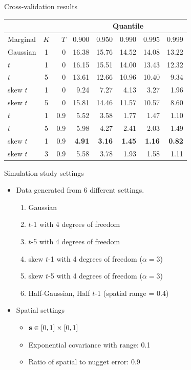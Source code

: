 \documentclass{beamer}
\begin{document}
\begin{frame}{Cross-validation results}
  \begin{table}[htbp]
    \small
    \centering
    \begin{tabular}{l|c|r|rrrrr}
          \multicolumn{3}{c}{\ } & \multicolumn{5}{c}{Quantile}\\
           \hline
  Marginal & $K$ & $T$  & 0.900 & 0.950 & 0.990 & 0.995 & 0.999\\
  \hline
Gaussian & 1 & 0 & 16.38 & 15.76 & 14.52 & 14.08 & 13.22\\
$t$ & 1 & 0 & 16.15 & 15.51 & 14.00 & 13.43 & 12.32\\
$t$ & 5 & 0 & 13.61 & 12.66 & 10.96 & 10.40 & 9.34\\
skew $t$ & 1 & 0 & 9.24  & 7.27 & 4.13  & 3.27  & 1.96\\
skew $t$ & 5 & 0 & 15.81 & 14.46 & 11.57 & 10.57 & 8.60\\
$t$ & 1 & 0.9 & 5.52  & 3.58  & 1.77  & 1.47  & 1.10\\
$t$ & 5 & 0.9 & 5.98  & 4.27  & 2.41  & 2.03  & 1.49\\
 skew $t$ & 1 & 0.9 & {\bf 4.91}  & {\bf 3.16} & {\bf 1.45}  & {\bf 1.16}  & {\bf 0.82}\\
skew $t$ & 3 & 0.9 & 5.58 & 3.78 & 1.93& 1.58& 1.11\\
\hline
    \end{tabular}
  \end{table}
\end{frame}

\begin{frame}{Simulation study settings}
  \begin{itemize} \setlength{\itemsep}{0.5em}
    \item Data generated from 6 different settings.
    \begin{enumerate}[1.]
      \item Gaussian
      \item $t$-1 with 4 degrees of freedom
      \item $t$-5 with 4 degrees of freedom
      \item skew $t$-1 with 4 degrees of freedom ($\alpha = 3$)
      \item skew $t$-5 with 4 degrees of freedom ($\alpha = 3$)
      \item Half-Gaussian, Half $t$-1 (spatial range = 0.4)
    \end{enumerate}
    \item Spatial settings
    \begin{itemize}
      \item $\mbox{\bf s} \in [0, 1] \times [0, 1]$
      \item Exponential covariance with range: 0.1
      \item Ratio of spatial to nugget error: 0.9
    \end{itemize}
  \end{itemize}
\end{frame}
\end{document}
